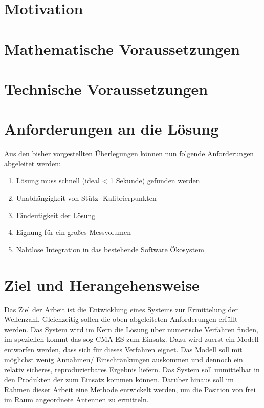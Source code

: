 %
\section[Motivation]{Motivation}

%
%
\section[mathematisches]{Mathematische Voraussetzungen}

%
%
\section[technisches]{Technische Voraussetzungen}

%
\section{Anforderungen an die Lösung}
Aus den bisher vorgestellten Überlegungen können nun folgende Anforderungen abgeleitet werden:
%
\begin{enumerate}
	\item Lösung muss schnell (ideal < 1 Sekunde) gefunden werden
	\item Unabhängigkeit von Stütz- Kalibrierpunkten
	\item Eindeutigkeit der Lösung
	\item Eignung für ein großes Messvolumen
	\item Nahtlose Integration in das bestehende Software Ökosystem
%
\end{enumerate}
%
\section{Ziel und Herangehensweise}
%
Das Ziel der Arbeit ist die Entwicklung eines Systems zur Ermittelung der Wellenzahl. Gleichzeitig sollen die oben abgeleiteten Anforderungen erfüllt werden. Das System wird im Kern die Lösung über numerische Verfahren finden, im speziellen kommt das sog CMA-ES zum Einsatz. Dazu wird zuerst ein Modell entworfen werden, dass sich für dieses Verfahren eignet. Das Modell soll mit möglichst wenig Annahmen/ Einschränkungen auskommen und dennoch ein relativ sicheres, reproduzierbares Ergebnis liefern. Das System soll unmittelbar in den Produkten der \amedogmbh zum Einsatz kommen können. Darüber hinaus soll im Rahmen dieser Arbeit eine Methode entwickelt werden, um die Position von frei im Raum angeordnete Antennen zu ermitteln.
%
